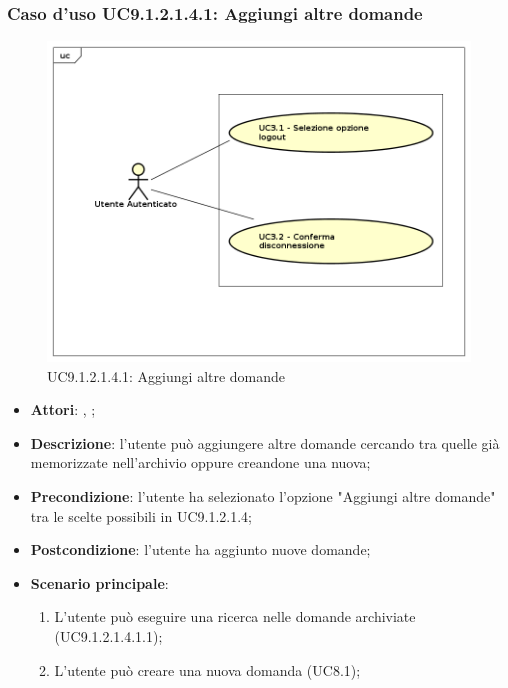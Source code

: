 						\subsubsection{Caso d'uso UC9.1.2.1.4.1: Aggiungi altre domande}
						\label{UC9.1.2.1.4.1}
						\begin{figure}[h]
							\centering
						\includegraphics[scale=0.5,keepaspectratio]{UML/UC9.png}
							\caption{UC9.1.2.1.4.1: Aggiungi altre domande}
						\end{figure}
						\FloatBarrier
						\begin{itemize}
							\item \textbf{Attori}: \uau, \uaupro;
							\item \textbf{Descrizione}: l'utente può aggiungere altre domande cercando tra quelle già memorizzate nell'archivio oppure creandone una nuova; 
							\item \textbf{Precondizione}: l'utente ha selezionato l'opzione "Aggiungi altre domande" tra le scelte possibili in UC9.1.2.1.4;
							\item \textbf{Postcondizione}: l'utente ha aggiunto nuove domande;
							\item \textbf{Scenario principale}:
								\begin{enumerate}
									\item L'utente può eseguire una ricerca nelle domande archiviate (UC9.1.2.1.4.1.1);
									\item L'utente può creare una nuova domanda (UC8.1);
								\end{enumerate}
						\end{itemize}
						
